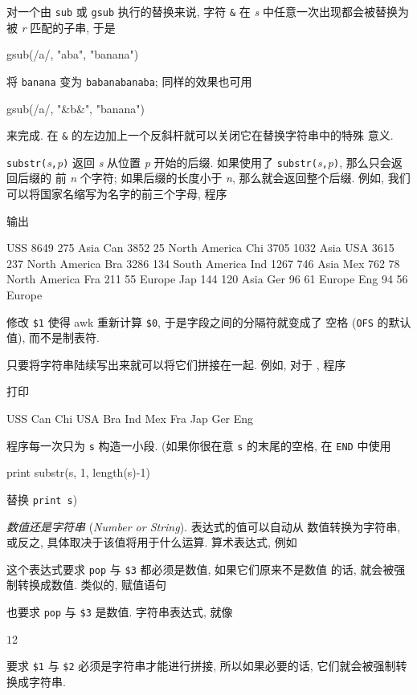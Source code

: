 对一个由 \verb'sub' 或 \verb'gsub' 执行的替换来说, 字符 \verb'&' 在
\textit{s} 中任意一次出现都会被替换为被 \textit{r} 匹配的子串, 于是
\begin{myverb}
    gsub(/a/, "aba", "banana")
\end{myverb}
将 \verb'banana' 变为 \verb'babanabanaba'; 同样的效果也可用
\begin{myverb}
    gsub(/a/, "&b&", "banana")
\end{myverb}
来完成. 在 \verb'&' 的左边加上一个反斜杆就可以关闭它在替换字符串中的特殊
意义.

\verb'substr('\textit{s}\verb','\textit{p}\verb')'
返回 \textit{s} 从位置 \textit{p} 开始的后缀. 如果使用了
\verb'substr('\textit{s}\verb','\textit{p}\verb')', 那么只会返回后缀的
前 \textit{n} 个字符; 如果后缀的长度小于 \textit{n}, 那么就会返回整个后缀.
例如, 我们可以将国家名缩写为名字的前三个字母, 程序
输出
\begin{myverb}
    USS 8649 275 Asia
    Can 3852 25 North America
    Chi 3705 1032 Asia
    USA 3615 237 North America
    Bra 3286 134 South America
    Ind 1267 746 Asia
    Mex 762 78 North America
    Fra 211 55 Europe
    Jap 144 120 Asia
    Ger 96 61 Europe
    Eng 94 56 Europe
\end{myverb}
修改 \verb'$1' 使得 awk 重新计算 \verb'$0', 于是字段之间的分隔符就变成了
空格 (\verb'OFS' 的默认值), 而不是制表符.

只要将字符串陆续写出来就可以将它们拼接在一起. 例如, 对于
, 程序
打印
\begin{myverb}
    USS Can Chi USA Bra Ind Mex Fra Jap Ger Eng
\end{myverb}
程序每一次只为 \verb's' 构造一小段. (如果你很在意 \verb's' 的末尾的空格,
在 \verb'END' 中使用
\begin{myverb}
    print substr(s, 1, length(s)-1)
\end{myverb}
替换 \verb'print s')

\emph{数值还是字符串} (\emph{Number or String}). 表达式的值可以自动从
数值转换为字符串, 或反之, 具体取决于该值将用于什么运算. 算术表达式, 例如
这个表达式要求 \verb'pop' 与 \verb'$3' 都必须是数值, 如果它们原来不是数值
的话, 就会被强制转换成数值. 类似的, 赋值语句
也要求 \verb'pop' 与 \verb'$3' 是数值. 字符串表达式, 就像
\begin{myverb}
    $1 $2
\end{myverb}
要求 \verb'$1' 与 \verb'$2' 必须是字符串才能进行拼接, 所以如果必要的话,
它们就会被强制转换成字符串.

